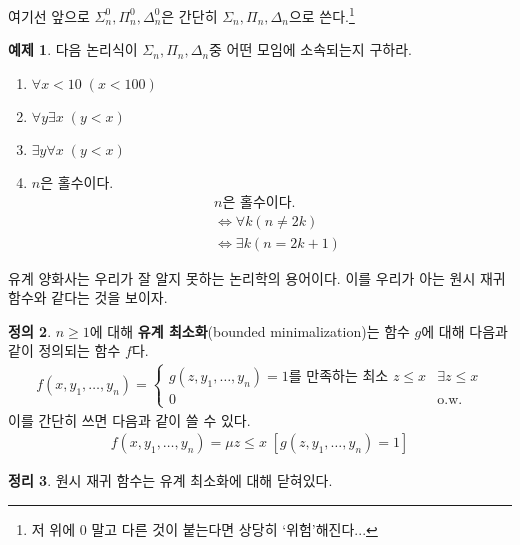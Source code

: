 \documentclass[b5paper, 11pt]{book}
\theoremstyle{definition}
\newtheorem{defn}{정의}[chapter]
\newtheorem{thm}[defn]{정리}
\newtheorem{ex}[defn]{예제}
\begin{document}
여기선 앞으로 $\Sigma_n^0, \Pi_n^0, \Delta_n^0$은 간단히 $\Sigma_n, \Pi_n, \Delta_n$으로 쓴다.\footnote{저 위에 0 말고 다른 것이 붙는다면 상당히 `위험'해진다...} 
\begin{ex}
    다음 논리식이 $\Sigma_n, \Pi_n, \Delta_n$중 어떤 모임에 소속되는지 구하라.
    \begin{enumerate}
        \item $\forall x < 10 \; (x < 100)$ 
        \item $\forall y \exists x \; (y < x)$
        \item $\exists y \forall x \; (y < x)$
        \item $n$은 홀수이다.
        \begin{align*}
            &n\text{은 홀수이다.} \\ 
            &\Leftrightarrow \forall k (n \neq 2k) \\ 
            &\Leftrightarrow \exists k (n = 2k + 1)
        \end{align*}
    \end{enumerate}
\end{ex}
유계 양화사는 우리가 잘 알지 못하는 논리학의 용어이다. 이를 우리가 아는 원시 재귀 함수와 같다는 것을 보이자. 
\begin{defn}
    $n \ge 1$에 대해 \textbf{유계 최소화}(bounded minimalization)는 함수 $g$에 대해 다음과 같이 정의되는 함수 $f$다.  
    \begin{align*}
        f(x, y_1, \ldots , y_n) = 
        \begin{cases}
            g(z, y_1, \ldots, y_n) = 1 \text{를 만족하는 최소 } z \le x & \exists z \le x \\ 
            0   & \text{o.w.}
        \end{cases}
    \end{align*}
    이를 간단히 쓰면 다음과 같이 쓸 수 있다.
    \begin{align*}
        f(x, y_1, \ldots, y_n) = \mu z \le x \; [g(z, y_1, \ldots, y_n) = 1]
    \end{align*}
\end{defn}
\begin{thm}\label{prf bm pf}
    원시 재귀 함수는 유계 최소화에 대해 닫혀있다. 
\end{thm}
\end{document}
